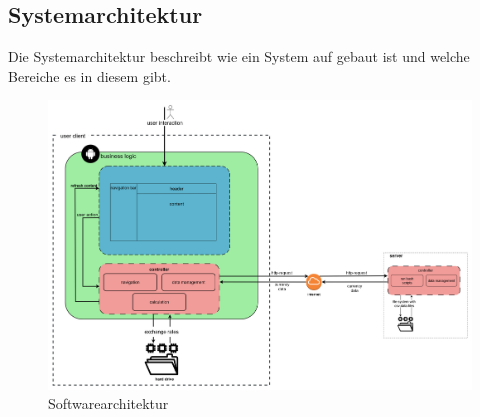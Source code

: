 \documentclass[conference]{IEEEtran}
\begin{document}
\subsection{Systemarchitektur}
Die Systemarchitektur beschreibt wie ein System auf gebaut ist und welche Bereiche es in diesem gibt. 

\begin{figure}[h]
	\centering
	\includegraphics[width=1\linewidth, frame]{Software-Architektur_SWEII}
	\caption[Softwarearchitektur]{Softwarearchitektur}
	\label{fig:software-architektursweii}
\end{figure}
\noindent
\end{document}
